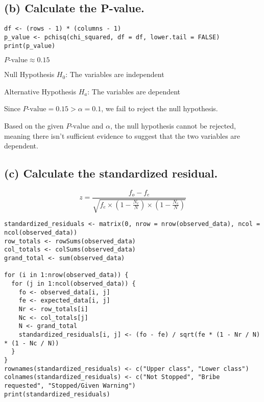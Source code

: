 \documentclass[12pt]{article}
\begin{document}
\subsection{(b) Calculate the P-value.}
\lstset{style=my}
\begin{lstlisting}
df <- (rows - 1) * (columns - 1)
p_value <- pchisq(chi_squared, df = df, lower.tail = FALSE)
print(p_value)   
\end{lstlisting}
\begin{center}
\( P\text{-value} \approx 0.15 \)
\end{center}

Null Hypothesis \( H_0 \): The variables are independent

Alternative Hypothesis \( H_a \): The variables are dependent


Since \( P\text{-value} = 0.15 > \alpha = 0.1 \), we fail to reject the null hypothesis.

Based on the given \( P\text{-value} \) and \( \alpha \), the null hypothesis cannot be rejected, meaning there isn't sufficient evidence to suggest that the two variables are dependent.

\subsection{(c) Calculate the standardized residual.}


\begin{equation}
z = \frac{f_o - f_e}{\sqrt{f_e \times \left(1 - \frac{N_r}{N}\right) \times \left(1 - \frac{N_c}{N}\right)}}
\end{equation}
\lstset{style=my}
\begin{lstlisting}
standardized_residuals <- matrix(0, nrow = nrow(observed_data), ncol = ncol(observed_data))
row_totals <- rowSums(observed_data)
col_totals <- colSums(observed_data)
grand_total <- sum(observed_data)

for (i in 1:nrow(observed_data)) {
  for (j in 1:ncol(observed_data)) {
    fo <- observed_data[i, j]
    fe <- expected_data[i, j]
    Nr <- row_totals[i]
    Nc <- col_totals[j]
    N <- grand_total
    standardized_residuals[i, j] <- (fo - fe) / sqrt(fe * (1 - Nr / N) * (1 - Nc / N))
  }
}
rownames(standardized_residuals) <- c("Upper class", "Lower class")
colnames(standardized_residuals) <- c("Not Stopped", "Bribe requested", "Stopped/Given Warning")
print(standardized_residuals)

\end{lstlisting}
\end{document}
